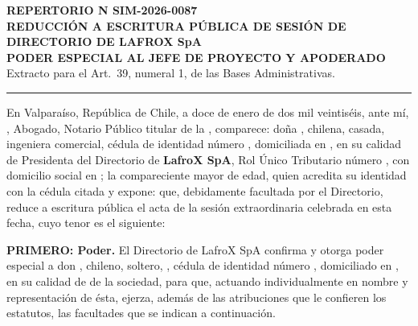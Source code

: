 \documentclass[11pt]{article}
\newcommand{\clau}[2]{\par\needspace{4\baselineskip}\textbf{#1.} #2\par}
\begin{document}
\begin{center}
\textbf{REPERTORIO N\textdegree{} SIM-2026-0087}\\[8pt]
\textbf{REDUCCIÓN A ESCRITURA PÚBLICA DE SESIÓN DE DIRECTORIO DE LAFROX SpA}\\
\textbf{PODER ESPECIAL AL JEFE DE PROYECTO Y APODERADO}\\[6pt]
{\small Extracto para el Art.~39\textdegree, numeral 1, de las Bases Administrativas.}
\end{center}
\hrule\vspace{6pt}

En Valparaíso, República de Chile, a doce de enero de dos mil veintiséis, ante mí, \textbf{\MakeUppercase{\SIMnotarioTitular}}, Abogado, Notario Público titular de la \SIMnotaria, comparece: doña \textbf{\SIMpresidenta}, chilena, casada, ingeniera comercial, cédula de identidad número \SIMpresidentarun, domiciliada en \SIMsocioBdom, en su calidad de Presidenta del Directorio de \textbf{LafroX SpA}, Rol Único Tributario número \LFXrut, con domicilio social en \LFXdomicilio; la compareciente mayor de edad, quien acredita su identidad con la cédula citada y expone: que, debidamente facultada por el Directorio, reduce a escritura pública el acta de la sesión extraordinaria celebrada en esta fecha, cuyo tenor es el siguiente:

\clau{PRIMERO: Poder}{El Directorio de LafroX SpA confirma y otorga poder especial a don \textbf{\SIMapoderado}, chileno, soltero, \SIMprofesion, cédula de identidad número \SIMapoderadorun, domiciliado en \SIMsocioAdom, en su calidad de \LFXcargo{} de la sociedad, para que, actuando individualmente en nombre y representación de ésta, ejerza, además de las atribuciones que le confieren los estatutos, las facultades que se indican a continuación.}
\end{document}
